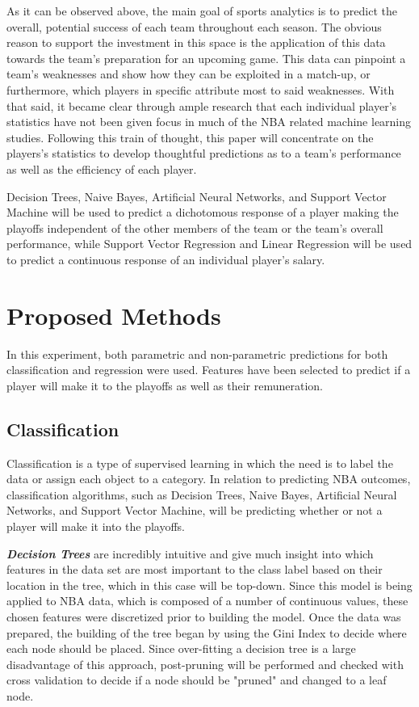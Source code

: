 \documentclass{article}
\begin{document}
As it can be observed above, the main goal of sports analytics is to predict the overall, potential success of each team throughout each season. 
The obvious reason to support the investment in this space is the application of this data towards the team's preparation for an upcoming game. 
This data can pinpoint a team's weaknesses and show how they can be exploited in a match-up, or furthermore, which players in specific attribute most to said weaknesses. 
With that said, it became clear through ample research that each individual player's statistics have not been given focus in much of the NBA related machine learning studies. 
Following this train of thought, this paper will concentrate on the players's statistics to develop thoughtful predictions as to a team's performance as well as the efficiency of each player. 

Decision Trees, Naive Bayes, Artificial Neural Networks, and Support Vector Machine will be used to predict a dichotomous response of a player making the playoffs independent of the other members of the team or the team's overall performance, while Support Vector Regression and Linear Regression will be used to predict a continuous response of an individual player's salary.

\section{Proposed Methods}

In this experiment, both parametric and non-parametric predictions for both classification and regression were used.
Features have been selected to predict if a player will make it to the playoffs as well as their remuneration.

\subsection{Classification} 
Classification is a type of supervised learning in which the need is to label the data or assign each object to a category. In relation to predicting NBA outcomes, classification algorithms, such as Decision Trees, Naive Bayes, Artificial Neural Networks, and Support Vector Machine, will be predicting whether or not a player will make it into the playoffs.

\textbf{\textit{Decision Trees}} are incredibly intuitive and give much insight into which features in the data set are most important to the class label based on their location in the tree, which in this case will be top-down. 
Since this model is being applied to NBA data, which is composed of a number of continuous values, these chosen features were discretized prior to building the model. 
Once the data was prepared, the building of the tree began by using the Gini Index to decide where each node should be placed. 
Since over-fitting a decision tree is a large disadvantage of this approach, post-pruning will be performed and checked with cross validation to decide if a node should be "pruned" and changed to a leaf node. 
\end{document}
